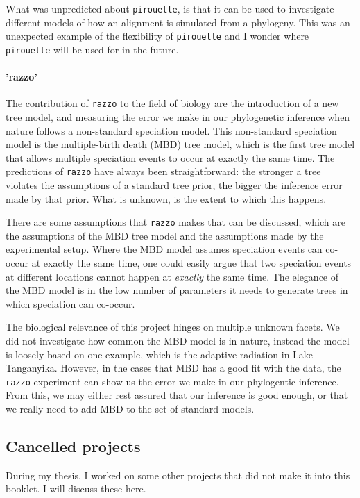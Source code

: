 What was unpredicted about \verb;pirouette;, is that it can be used to 
investigate different models of how an alignment is simulated
from a phylogeny. This was an unexpected example of the flexibility of 
\verb;pirouette; and I wonder where \verb;pirouette; will be used for in the future.

\paragraph{'razzo'} 

The contribution of \verb;razzo; to the field of biology
are the introduction of a new tree model, 
and measuring the error we make in our phylogenetic inference when
nature follows a non-standard speciation model.
This non-standard speciation model is the multiple-birth death (MBD) tree model,
which is the first tree model that allows multiple speciation events to occur 
at exactly the same time.
The predictions of \verb;razzo; have always been straightforward:
the stronger a tree violates the assumptions of a standard tree
prior, the bigger the inference error made by that prior.
What is unknown, is the extent to which this happens.

There are some assumptions that \verb;razzo; makes that can be discussed,
which are the assumptions of the MBD tree model and the assumptions
made by the experimental setup.
Where the MBD model assumes speciation events can co-occur at exactly
the same time, one could easily argue that two speciation events
at different locations cannot happen at \emph{exactly} the same time.
The elegance of the MBD model is in the low number of parameters it
needs to generate trees in which speciation can co-occur.

The biological relevance of this project hinges on multiple unknown
facets. We did not investigate how common the MBD model is in nature,
instead the model is loosely based on one example, which is the 
adaptive radiation in Lake Tanganyika. However,
in the cases that MBD has a good fit with the data, 
the \verb;razzo; experiment can show us the error we make in our phylogentic 
inference. From this, we may either rest assured that our inference is good 
enough, or that we really need to add MBD to the set of standard models.

\subsection{Cancelled projects}

During my thesis, I worked on some other projects that did not make
it into this booklet. I will discuss these here.

